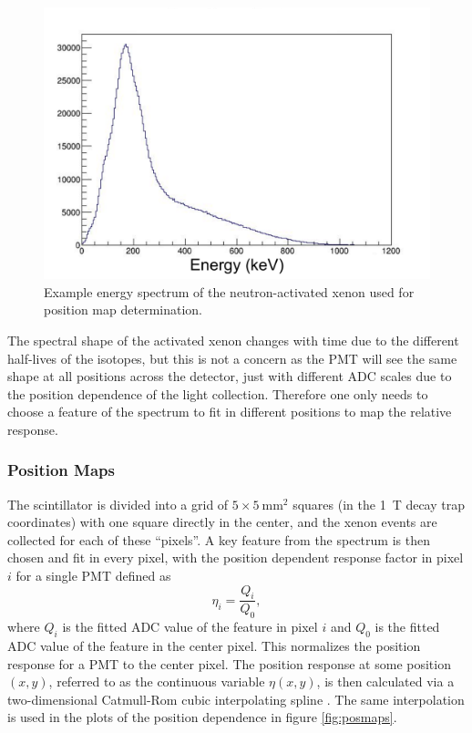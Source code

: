 \begin{figure}[h] 
\centering
\includegraphics[scale=.5]{4-UCNACalibrations/xenonSpectrum.pdf}
\caption{Example energy spectrum of the neutron-activated xenon used for position map determination. }
\label{fig:xenonSpectrum}
\end{figure}

The spectral shape of the activated xenon changes with time due to the different half-lives
of the isotopes, but this is not a concern as the PMT will see the same shape at all positions
across the detector, just with different ADC scales due to the position dependence of the light
collection. Therefore one only needs to choose a feature of the spectrum to fit in different
positions to map the relative response.

\subsubsection{Position Maps}

The scintillator is divided into a grid of $5\times5\mathrm{~mm}^2$ squares (in the 1~T
decay trap coordinates) with one square directly in the center,
and the xenon events are collected for each of these ``pixels''. A key feature
from the spectrum is then chosen and fit in every pixel, with the position dependent response
factor in pixel $i$ for a single PMT defined as
%
\begin{equation}
  \eta_i = \frac{Q_i}{Q_0},
\end{equation}
%
where $Q_i$ is the fitted ADC value of the feature in pixel $i$ and $Q_0$ is the fitted ADC value of the
feature in the center pixel. This normalizes the position response for a PMT to the center pixel. The
position response at some position $(x,y)$, referred to as the continuous variable $\eta(x,y)$,
is then calculated via a two-dimensional Catmull-Rom
cubic interpolating spline \cite{catmull1974}. The same interpolation is used in the plots of the
position dependence in figure \ref{fig:posmaps}.


